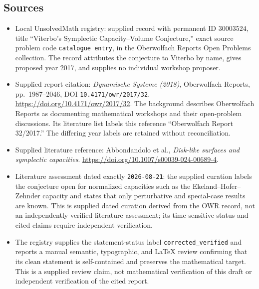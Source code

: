 \documentclass[11pt]{article}
\begin{document}
\subsection{Sources}
\begin{itemize}
\item Local UnsolvedMath registry: supplied record with permanent ID \(30003524\), title ``Viterbo's Symplectic Capacity--Volume Conjecture,'' exact source problem code \texttt{catalogue entry}, in the Oberwolfach Reports Open Problems collection. The record attributes the conjecture to Viterbo by name, gives proposed year 2017, and supplies no individual workshop proposer.
\item Supplied report citation: \emph{Dynamische Systeme (2018)}, Oberwolfach Reports, pp.~1987--2046, DOI \texttt{10.4171/owr/2017/32}. \url{https://doi.org/10.4171/owr/2017/32}. The background describes Oberwolfach Reports as documenting mathematical workshops and their open-problem discussions. Its literature list labels this reference ``Oberwolfach Report 32/2017.'' The differing year labels are retained without reconciliation.
\item Supplied literature reference: Abbondandolo et al., \emph{Disk-like surfaces and symplectic capacities}. \url{https://doi.org/10.1007/s00039-024-00689-4}.
\item Literature assessment dated exactly \texttt{2026-08-21}: the supplied curation labels the conjecture open for normalized capacities such as the Ekeland--Hofer--Zehnder capacity and states that only perturbative and special-case results are known. This is supplied dated curation derived from the OWR record, not an independently verified literature assessment; its time-sensitive status and cited claims require independent verification.
\item The registry supplies the statement-status label \texttt{corrected\_verified} and reports a manual semantic, typographic, and LaTeX review confirming that its clean statement is self-contained and preserves the mathematical target. This is a supplied review claim, not mathematical verification of this draft or independent verification of the cited report.
\end{itemize}
\end{document}
